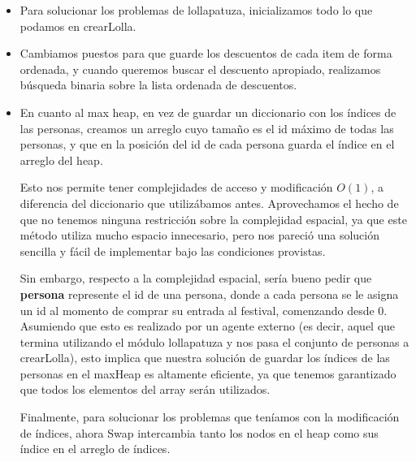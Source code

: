 \documentclass[10pt, a4paper]{article}
\begin{document}
\clearpage
\aclaracionesII
\begin{itemize}
    \item Para solucionar los problemas de lollapatuza, inicializamos todo lo que podamos en crearLolla.

    \item Cambiamos puestos para que guarde los descuentos de cada item de forma ordenada, y cuando queremos buscar el descuento apropiado, realizamos búsqueda binaria sobre la lista ordenada de descuentos.

    \item En cuanto al max heap, en vez de guardar un diccionario con 
los índices de las personas, creamos un arreglo cuyo tamaño es el id
máximo de todas las personas, y que en la posición del id de cada persona guarda el índice en el arreglo del heap.

    Esto nos permite tener complejidades de acceso y modificación $O(1)$, a diferencia del diccionario que utilizábamos antes. Aprovechamos el hecho de que no tenemos ninguna restricción sobre la complejidad espacial, ya que este método utiliza mucho espacio innecesario, pero nos pareció una solución sencilla y fácil de implementar bajo las condiciones provistas.

    Sin embargo, respecto a la complejidad espacial, sería bueno pedir que \textbf{persona} represente el id de una persona, donde a cada persona se le asigna un id al momento de comprar su entrada al festival, comenzando desde 0. Asumiendo que esto es realizado por un agente externo (es decir, aquel que termina utilizando el módulo lollapatuza y nos pasa el conjunto de personas a crearLolla), esto implica que nuestra solución de guardar los índices de las personas en el maxHeap es altamente eficiente, ya que tenemos garantizado que todos los elementos del array serán utilizados.
    
    Finalmente, para solucionar los problemas que teníamos con la modificación de índices, ahora Swap intercambia tanto los nodos en el heap como sus índice en el arreglo de índices.
\end{itemize}

\clearpage


\clearpage


\clearpage


\clearpage


\clearpage

%
\end{document}
